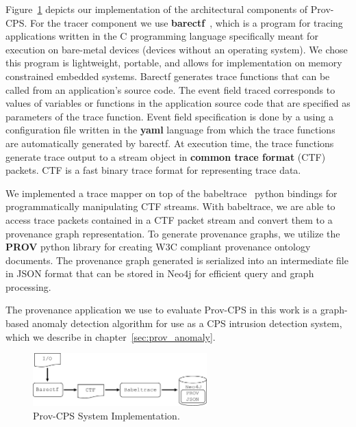 Figure~\ref{figure} depicts our implementation of the architectural components of Prov-CPS. For the tracer component we use \textbf{barectf}~\cite{barectf}, which is a program for tracing applications written in the C programming language specifically meant for execution on bare-metal devices (devices without an operating system). We chose this program is lightweight, portable, and allows for implementation on memory constrained embedded systems.
%
%
Barectf generates trace functions that can be called from an application's source code. The event field traced corresponds to values of variables or functions in the application source code that are specified as parameters of the trace function. 
%
%
%
%
Event field specification is done by a using a configuration file written in the \textbf{yaml} language from which the trace functions are automatically generated by barectf. At execution time, the trace functions generate trace output to a stream object in \textbf{common trace format} (CTF)~\cite{ctf} packets. CTF is a fast binary trace format for representing trace data.

We implemented a trace mapper on top of the babeltrace~\cite{babeltrace} python bindings for programmatically manipulating CTF streams. With babeltrace, we are able to access trace packets contained in a CTF packet stream and convert them to a provenance graph representation. To generate provenance graphs, we utilize the \textbf{PROV} python library for creating W3C compliant provenance ontology documents. The provenance graph generated is serialized into an intermediate file in JSON format that can be stored in Neo4j for efficient query and graph processing.

The provenance application we use to evaluate Prov-CPS in this work is a graph-based anomaly detection algorithm for use as a CPS intrusion detection system, which we describe in chapter~\ref{sec:prov_anomaly}.

 \begin{figure}[h!]
\begin{center}
\includegraphics[width=0.6\textwidth]{system_implementation_v4.pdf}
\end{center}
\caption{Prov-CPS System Implementation.}
\label{figure}
\end{figure}

